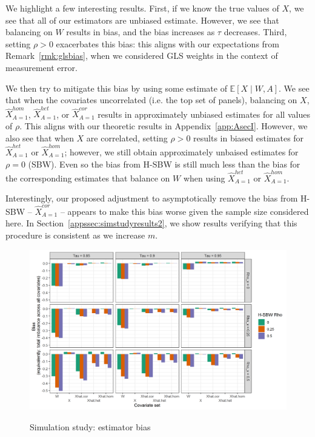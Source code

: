 We highlight a few interesting results. First, if we know the true values of $X$, we see that all of our estimators are unbiased estimate. However, we see that balancing on $W$ results in bias, and the bias increases as $\tau$ decreases. Third, setting $\rho > 0$ exacerbates this bias: this aligns with our expectations from Remark~\ref{rmk:glsbias}, when we considered GLS weights in the context of measurement error.

We then try to mitigate this bias by using some estimate of $\mathbb{E}[X \mid W, A]$. We see that when the covariates  uncorrelated (i.e. the top set of panels), balancing on $X$, $\hat{X}_{A=1}^{hom}$, $\hat{X}_{A=1}^{het}$, or $\hat{X}_{A=1}^{cor}$ results in approximately unbiased estimates for all values of $\rho$. This aligns with our theoretic results in Appendix~\ref{app:AsecI}. However, we also see that when $X$ are correlated, setting $\rho > 0$ results in biased estimates for $\hat{X}_{A=1}^{het}$ or $\hat{X}_{A=1}^{hom}$; however, we still obtain approximately unbaised estimates for $\rho = 0$ (SBW). Even so the bias from H-SBW is still much less than the bias for the corresponding estimates that balance on $W$ when using $\hat{X}_{A=1}^{het}$ or $\hat{X}_{A=1}^{hom}$.

Interestingly, our proposed adjustment to asymptotically remove the bias from H-SBW -- $\hat{X}_{A=1}^{cor}$ -- appears to make this bias worse given the sample size considered here. In Section~\ref{appssec:simstudyresults2}, we show results verifying that this procedure is consistent as we increase $m$.

\begin{figure}[H]
\begin{center}
    \caption{Simulation study: estimator bias}\label{fig:simbias}
    \label{fig:loveplotc1}
    \includegraphics[scale=0.5]{01_Plots/bias-plot.png}
\end{center}
\end{figure}


